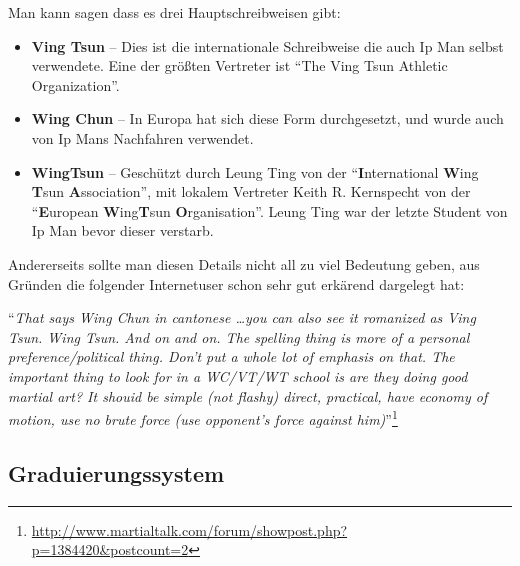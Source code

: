 \documentclass[a4paper,12pt]{scrartcl}
\begin{document}
Man kann sagen dass es drei Hauptschreibweisen gibt:

\begin{itemize}
	\item \textbf{Ving Tsun} -- Dies ist die internationale Schreibweise die auch Ip Man selbst verwendete. Eine der gr\"o{\ss}ten Vertreter ist ``The Ving Tsun Athletic Organization''.
	\item \textbf{Wing Chun} -- In Europa hat sich diese Form durchgesetzt, und wurde auch von Ip Mans Nachfahren verwendet.
	\item \textbf{WingTsun} -- Gesch\"utzt durch Leung Ting von der ``\textbf{I}nternational \textbf{W}ing \textbf{T}sun \textbf{A}ssociation'', mit lokalem Vertreter Keith R. Kernspecht von der ``\textbf{E}uropean \textbf{W}ing\textbf{T}sun \textbf{O}rganisation''. Leung Ting war der letzte Student von Ip Man bevor dieser verstarb.
\end{itemize}


Andererseits sollte man diesen Details nicht all zu viel Bedeutung geben, aus Gr\"unden die folgender Internetuser schon sehr gut erk\"arend dargelegt hat:

``\textit{That says Wing Chun in cantonese \ldots you can also see it romanized as Ving Tsun. Wing Tsun. And on and on. The spelling thing is more of a personal preference/political thing. Don't put a whole lot of emphasis on that.
The important thing to look for in a WC/VT/WT school is are they doing good martial art? It shouid be simple (not flashy) direct, practical, have economy of motion, use no brute force (use opponent's force against him)}''\footnote{\url{http://www.martialtalk.com/forum/showpost.php?p=1384420&postcount=2}}

\subsection{Graduierungssystem}
\end{document}
